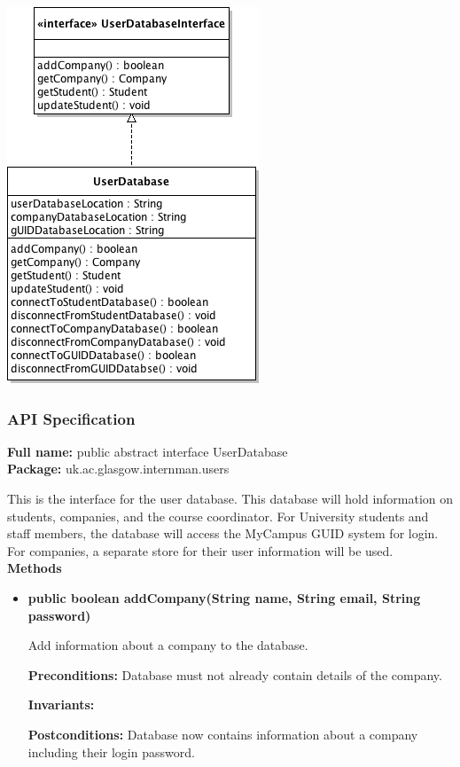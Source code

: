 \documentclass[12pt]{article}
\begin{document}
\begin{itemize}
\includegraphics{databaseClassDiagram.png}

\subsubsection{API Specification}

\textbf{Full name:} public abstract interface UserDatabase\\

\textbf{Package:} uk.ac.glasgow.internman.users

This is the interface for the user database. This database will hold information
on students, companies, and the course coordinator. For University students and
staff members, the database will access the MyCampus GUID system for login. For
companies, a separate store for their user information will be used.\\

\textbf{Methods}

\begin{itemize}

\item{\textbf{public boolean addCompany(String name, String email, String 
password)}

Add information about a company to the database.

\textbf{Preconditions:} Database must not already contain details of the 
company.

\textbf{Invariants:}

\textbf{Postconditions:} Database now contains information about a company 
including their login password.}


\end{itemize}
\end{itemize}
\end{document}
